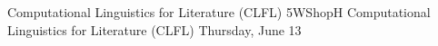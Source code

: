 \begin{wsschedule}
{Computational Linguistics for Literature (CLFL)}
{5}{WShopH}
{Computational Linguistics for Literature (CLFL)}
{Thursday, June 13}{\WShopLocH}

\end{wsschedule}
